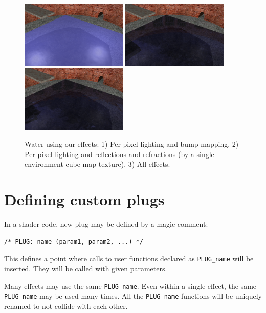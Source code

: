 \documentclass{egpubl}
\newenvironment{mycode}
{\begin{mycodecore}}
{\end{mycodecore}
\vspace{-0.1in}}
\begin{document}
\setcounter{figure}{7}
\begin{figure}[b]
  \centering
  \includegraphics[width=2.0in]{water_shaders_1}
  \includegraphics[width=2.0in]{water_shaders_2}
  \includegraphics[width=2.0in]{water_shaders_3}
  \caption{Water using our effects: 1) Per-pixel lighting and bump mapping.
2) Per-pixel lighting and reflections and refractions (by a single environment cube map texture).
3) All effects.}
  \label{fig_water}
\end{figure}
\setcounter{figure}{5}

\section{Defining custom plugs}

In a shader code, new plug may be defined by a magic comment:

\begin{mycode}
\begin{Verbatim}[commandchars=\\\{\},fontsize=\small]
/* PLUG: name (param1, param2, ...) */
\end{Verbatim}
\end{mycode}

This defines a point where calls to user functions declared as
\texttt{PLUG\_name} will be inserted. They will be called with given
parameters.

Many effects may use the same \texttt{PLUG\_name}.
Even within a single effect, the same \texttt{PLUG\_name} may be used
many times. All the \texttt{PLUG\_name} functions
will be uniquely renamed to not collide with each other.
\end{document}
